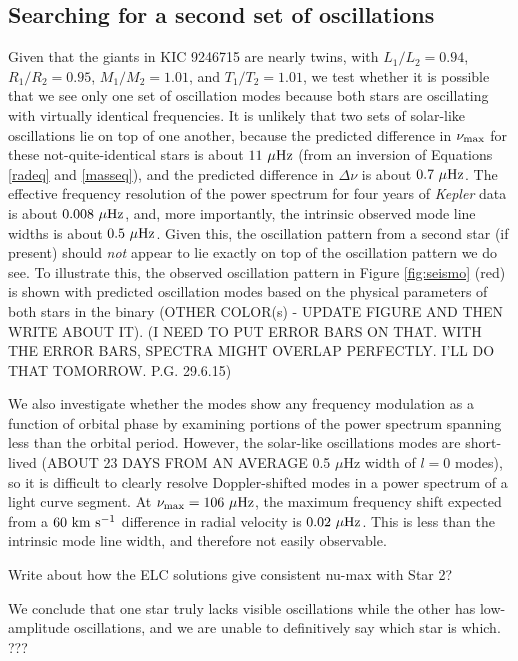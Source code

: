 \subsection{Searching for a second set of oscillations}

Given that the giants in KIC 9246715 are nearly twins, with $L_1/L_2 = 0.94$, $R_1/R_2 = 0.95$, $M_1/M_2 = 1.01$, and $T_1/T_2 = 1.01$, we test whether it is possible that we see only one set of oscillation modes because both stars are oscillating with virtually identical frequencies. It is unlikely that two sets of solar-like oscillations lie on top of one another, because the predicted difference in $\nu_{\rm{max}}$ for these not-quite-identical stars is about $11 \ \mu \rm{Hz}$ (from an inversion of Equations \ref{radeq} and \ref{masseq}), and the predicted difference in $\Delta \nu$ is about $0.7 \ \mu \rm{Hz}$. The effective frequency resolution of the power spectrum for four years of \emph{Kepler} data is about $0.008 \ \mu \rm{Hz}$, and, more importantly, the intrinsic observed mode line widths is about $0.5 \ \mu \rm{Hz}$.
Given this, the oscillation pattern from a second star (if present) should \emph{not} appear to lie exactly on top of the oscillation pattern we do see. To illustrate this, the observed oscillation pattern in Figure \ref{fig:seismo} (red) is shown with predicted oscillation modes based on the physical parameters of both stars in the binary (OTHER COLOR(s) - UPDATE FIGURE AND THEN WRITE ABOUT IT). (I NEED TO PUT ERROR BARS ON THAT. WITH THE ERROR BARS, SPECTRA MIGHT OVERLAP PERFECTLY. I'LL DO THAT TOMORROW. P.G. 29.6.15)

We also investigate whether the modes show any frequency modulation as a function of orbital phase by examining portions of the power spectrum spanning less than the orbital period. However, the solar-like oscillations modes are short-lived (ABOUT 23 DAYS FROM AN AVERAGE 0.5 $\mu$Hz width of $l=0$ modes), so it is difficult to clearly resolve Doppler-shifted modes in a power spectrum of a light curve segment. At $\nu_{\rm{max}} = 106 \ \mu \rm{Hz}$, the maximum frequency shift expected from a $60 \ \rm{km} \ \rm{s}^{-1}$ difference in radial velocity is $0.02 \ \mu \rm{Hz}$. This is less than the intrinsic mode line width, and therefore not easily observable.

Write about how the ELC solutions give consistent nu-max with Star 2?

We conclude that one star truly lacks visible oscillations while the other has low-amplitude oscillations, and we are unable to definitively say which star is which. ???
    
    
    
    
    
    
  
  
  
